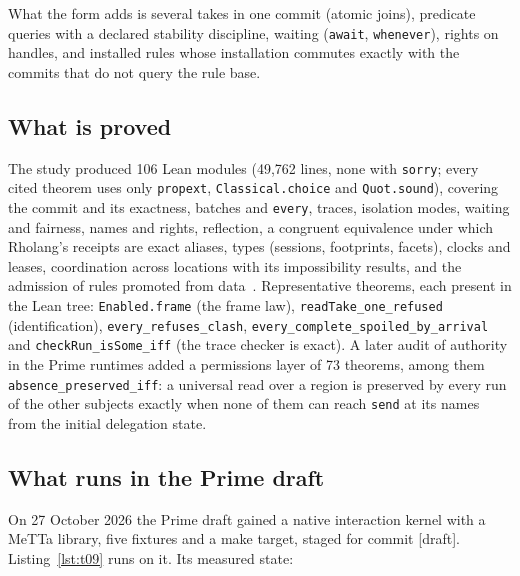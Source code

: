 \documentclass[11pt]{article}
\newcommand{\code}[1]{\texttt{#1}}
\newcommand{\kind}[1]{\textsf{\small[#1]}}
\begin{document}
\noindent
What the form adds is several takes in one commit (atomic joins), predicate
queries with a declared stability discipline, waiting (\code{await}, \code{whenever}),
rights on handles, and installed rules whose installation commutes exactly
with the commits that do not query the rule base.

\subsection{What is proved}

The study produced 106 Lean modules (49{,}762 lines, none with \code{sorry};
every cited theorem uses only \code{propext}, \code{Classical.choice} and
\code{Quot.sound}), covering the commit and its exactness, batches and
\code{every}, traces, isolation modes, waiting and fairness, names and rights,
reflection, a congruent equivalence under which Rholang's receipts are exact
aliases, types (sessions, footprints, facets), clocks and leases, coordination
across locations with its impossibility results, and the admission of rules
promoted from data~\cite{interaction-basis}.  Representative theorems, each
present in the Lean tree: \code{Enabled.frame} (the frame law),
\code{readTake\_one\_refused} (identification), \code{every\_refuses\_clash},
\code{every\_complete\_spoiled\_by\_arrival} and \code{checkRun\_isSome\_iff}
(the trace checker is exact).  A later audit of authority in the Prime runtimes
added a permissions layer of 73 theorems, among them
\code{absence\_preserved\_iff}: a universal read over a region is preserved by
every run of the other subjects exactly when none of them can reach
\code{send} at its names from the initial delegation state.

\subsection{What runs in the Prime draft}

On 27 October 2026 the Prime draft gained a native interaction kernel with a
MeTTa library, five fixtures and a make target, staged for commit
\kind{draft}.  Listing~\ref{lst:t09} runs on it.  Its measured state:
\end{document}
